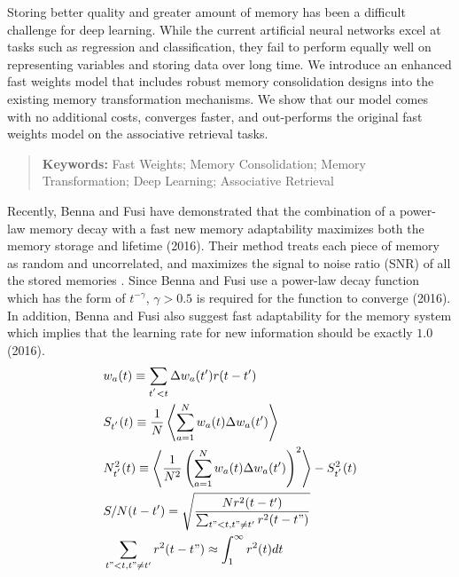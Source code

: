 \documentclass[portrait,a0b,final,a4resizeable]{include/a0poster}
\begin{document}
\begin{poster}
\begin{multicols}{3}
% 
%
% 
\vspace{0.2in}
% 
{
\Large\sffamily
Storing better quality and greater amount of memory has been a difficult challenge for deep learning.
While the current artificial neural networks excel at tasks such as regression and classification, they fail to perform equally well on representing variables and storing data over long time.
We introduce an enhanced fast weights model that includes robust memory consolidation designs into the existing memory transformation mechanisms.
We show that our model comes with no additional costs, converges faster, and out-performs the original fast weights model on the associative retrieval tasks.
}
\begin{quote}
\vspace{0.2in}
\textbf{Keywords:} 
Fast Weights; Memory Consolidation; Memory Transformation; Deep Learning; Associative Retrieval
\end{quote}

\vspace{0.5in}

%
Recently, Benna and Fusi have demonstrated that the combination of a power-law memory decay with a fast new memory adaptability maximizes both the memory storage and lifetime (2016).
Their method treats each piece of memory as random and uncorrelated, and maximizes the signal to noise ratio (SNR) of all the stored memories \cite{pld}.
Since Benna and Fusi use a power-law decay function which has the form of \emph{$t^{-\gamma}$}, $\gamma > 0.5$ is required for the function to converge (2016).
In addition, Benna and Fusi also suggest fast adaptability for the memory system which implies that the learning rate for new information should be exactly $1.0$ (2016).
% 
\vspace{0.25in}
\begin{align}
    &w_a(t) \equiv \sum_{t^{'} < t} \Delta w_a(t') r(t-t')
    \label{eq:memory} \\
    &S_{t^{'}}(t) \equiv \frac{1}{N}\left<\sum_{a=1}^N w_a(t)\Delta w_a(t') \right>
    \label{eq:signal} \\
    &N^2_{t^{'}}(t) \equiv \left<\frac{1}{N^2}\left(\sum_{a=1}^N w_a(t)\Delta w_a(t') \right)^2 \right> - S^2_{t^{'}}(t)
    \label{eq:variance} \\
    &S / N(t - t') = \sqrt{\frac{N r^2(t - t')}{\sum_{t" < t, t" \neq t'} r^2(t- t")}}
    \label{eq:snr}\\
    &\sum_{t" < t, t" \neq t'} r^2(t- t") \approx \int_{1}^{\infty} r^2(t) dt 
    \label{eq:decay}
\end{align}
\vspace{0.25in}


\end{multicols}
\end{poster}
\end{document}
